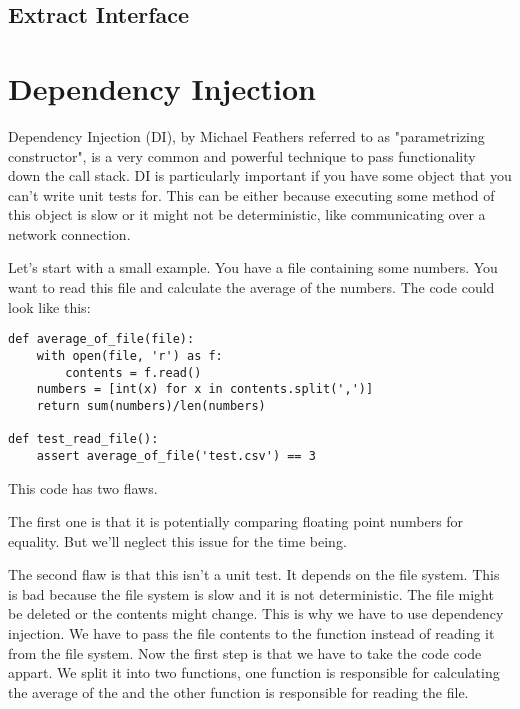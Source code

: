 \subsection{Extract Interface}


\section{Dependency Injection}\label{sec:dependency_injection}

Dependency Injection (DI), by Michael Feathers referred to as "parametrizing constructor", is a very common and powerful technique to pass functionality down the call stack. DI is particularly important if you have some object that you can't write unit tests for. This can be either because executing some method of this object is slow or it might not be deterministic, like communicating over a network connection.

Let's start with a small example. You have a file containing some numbers. You want to read this file and calculate the average of the numbers. The code could look like this:

\begin{programcode}{}\label{prog:average_of_file}
\begin{verbatim}
def average_of_file(file):
    with open(file, 'r') as f:
        contents = f.read()
    numbers = [int(x) for x in contents.split(',')]
    return sum(numbers)/len(numbers)

def test_read_file():
    assert average_of_file('test.csv') == 3
\end{verbatim} 
\end{programcode}

This code has two flaws. 

The first one is that it is potentially comparing floating point numbers for equality. But we'll neglect this issue for the time being.

The second flaw is that this isn't a unit test. It depends on the file system. This is bad because the file system is slow and it is not deterministic. The file might be deleted or the contents might change. This is why we have to use dependency injection. We have to pass the file contents to the function instead of reading it from the file system. Now the first step is that we have to take the code code appart. We split it into two functions, one function is responsible for calculating the average of the  and the other function is responsible for reading the file.

